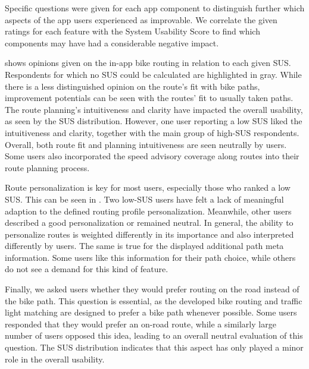 Specific questions were given for each app component to distinguish further which aspects of the app users experienced as improvable. We correlate the given ratings for each feature with the System Usability Score to find which components may have had a considerable negative impact.

 shows opinions given on the in-app bike routing in relation to each given SUS. Respondents for which no SUS could be calculated are highlighted in gray. While there is a less distinguished opinion on the route's fit with bike paths, improvement potentials can be seen with the routes' fit to usually taken paths. The route planning's intuitiveness and clarity have impacted the overall usability, as seen by the SUS distribution. However, one user reporting a low SUS liked the intuitiveness and clarity, together with the main group of high-SUS respondents. Overall, both route fit and planning intuitiveness are seen neutrally by users. Some users also incorporated the speed advisory coverage along routes into their route planning process.

Route personalization is key for most users, especially those who ranked a low SUS. This can be seen in . Two low-SUS users have felt a lack of meaningful adaption to the defined routing profile personalization. Meanwhile, other users described a good personalization or remained neutral. In general, the ability to personalize routes is weighted differently in its importance and also interpreted differently by users. The same is true for the displayed additional path meta information. Some users like this information for their path choice, while others do not see a demand for this kind of feature. 

Finally, we asked users whether they would prefer routing on the road instead of the bike path. This question is essential, as the developed bike routing and traffic light matching are designed to prefer a bike path whenever possible. Some users responded that they would prefer an on-road route, while a similarly large number of users opposed this idea, leading to an overall neutral evaluation of this question. The SUS distribution indicates that this aspect has only played a minor role in the overall usability.

